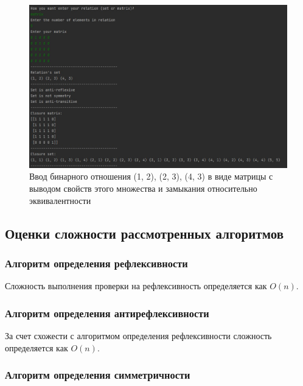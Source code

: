 \documentclass[spec, och, labwork]{shiza}
\begin{document}
        \begin{figure}[H]
            \centering      %
            \includegraphics[width=1.\textwidth]{4}
            \caption{Ввод бинарного отношения {(1, 2), (2, 3), (4, 3)} в виде матрицы с выводом свойств этого множества и замыкания относительно эквивалентности}
            \label{fig:image1}
        \end{figure}

        \subsection{Оценки сложности рассмотренных алгоритмов}

        \subsubsection{Алгоритм определения рефлексивности}

            Сложность выполнения проверки на рефлексивность определяется как $O(n)$.
        
        \subsubsection{Алгоритм определения антирефлексивности}

            За счет схожести с алгоритмом определения рефлексивности сложность определяется как $O(n)$.

        \subsubsection{Алгоритм определения симметричности}
\end{document}
